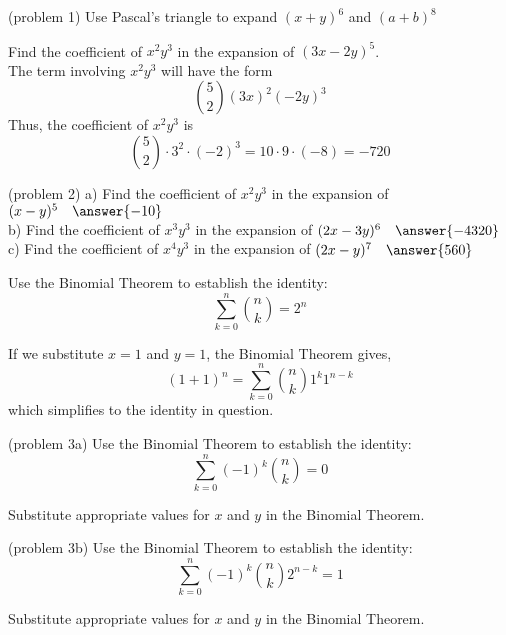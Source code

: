 \documentclass[handout]{ximera}
\begin{document}
\begin{problem}(problem 1)
Use Pascal's triangle to expand $(x+y)^6$ and $(a+b)^8$
\end{problem}

\begin{example}[example 2]
Find the coefficient of $x^2y^3$ in the expansion of $(3x-2y)^5$.\\
The term involving $x^2y^3$ will have the form
\[
\binom{5}{2}(3x)^2(-2y)^3
\]
Thus, the coefficient of $x^2y^3$ is
\[
\binom{5}{2}\cdot 3^2 \cdot (-2)^3 = 10\cdot 9 \cdot (-8) = -720
\]
\end{example}

\begin{problem}(problem 2)
a) Find the coefficient of $x^2y^3$ in the expansion of $(x-y)^5 \quad \answer{-10}$\\
b) Find the coefficient of $x^3y^3$ in the expansion of $(2x-3y)^6 \quad \answer{-4320}$\\
c) Find the coefficient of $x^4y^3$ in the expansion of $(2x-y)^7 \quad \answer{560}$\\
\end{problem}


\begin{example}[example 3]
Use the Binomial Theorem to establish the identity:
\[
\sum_{k=0}^n \binom{n}{k} = 2^n
\]

If we substitute $x=1$ and $y=1$, the Binomial Theorem gives,
\[
(1+1)^n = \sum_{k=0}^n \binom{n}{k} 1^k 1^{n-k}
\]
which simplifies to the identity in question.
\end{example}

\begin{problem}(problem 3a)
Use the Binomial Theorem to establish the identity:
\[
\sum_{k=0}^n (-1)^k\binom{n}{k} = 0
\]
\begin{hint}
Substitute appropriate values for $x$ and $y$ in the Binomial Theorem.
\end{hint}

\end{problem}

\begin{problem}(problem 3b)
Use the Binomial Theorem to establish the identity:
\[
\sum_{k=0}^n (-1)^k\binom{n}{k}2^{n-k} = 1
\]
\begin{hint}
Substitute appropriate values for $x$ and $y$ in the Binomial Theorem.
\end{hint}

\end{problem}
\end{document}
